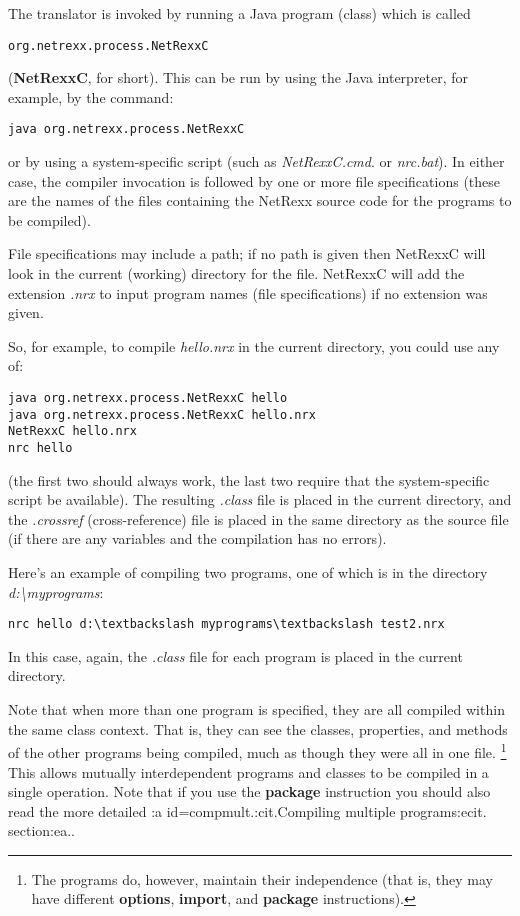 The translator is invoked by running a Java program (class) which is
called 
\begin{verbatim}
org.netrexx.process.NetRexxC
\end{verbatim}  
(\textbf{NetRexxC}, for short). This can be run by using the Java interpreter, for example,
by the command:
\begin{verbatim}
java org.netrexx.process.NetRexxC
\end{verbatim}
or by using a system-specific script (such as \emph{NetRexxC.cmd}.
or \emph{nrc.bat}).  In either case, the compiler invocation is followed
by one or more file specifications (these are the names of the files
containing the NetRexx source code for the programs to be compiled).

File specifications may include a path; if no path is given then
NetRexxC will look in the current (working) directory for the file.
NetRexxC will add the extension \emph{.nrx} to input program names (file
specifications) if no extension was given.

So, for example, to compile \emph{hello.nrx} in the current directory,
you could use any of:
\begin{verbatim}
java org.netrexx.process.NetRexxC hello
java org.netrexx.process.NetRexxC hello.nrx
NetRexxC hello.nrx
nrc hello
\end{verbatim}
(the first two should always work, the last two require that the
system-specific script be available).  The resulting \emph{.class} file
is placed in the current directory, and the \emph{.crossref}
(cross-reference) file is placed in the same directory as the source
file (if there are any variables and the compilation has no errors).

Here's an example of compiling two programs, one of which is in the
directory \emph{d:\textbackslash myprograms}:
\begin{verbatim}
nrc hello d:\textbackslash myprograms\textbackslash test2.nrx
\end{verbatim}

In this case, again, the \emph{.class} file for each program is placed
in the current directory.

Note that when more than one program is specified, they are all compiled
within the same class context.  That is, they can see the
classes, properties, and methods of the other programs being compiled,
much as though they were all in one file.
\footnote{The programs do, however, maintain their independence (that is, they may
have different \textbf{options}, \textbf{import}, and \textbf{package}
instructions).}
This allows mutually interdependent programs and classes to be compiled
in a single operation.
Note that if you use the \textbf{package} instruction you should also
read the more detailed :a id=compmult.:cit.Compiling multiple
programs:ecit. section:ea..

